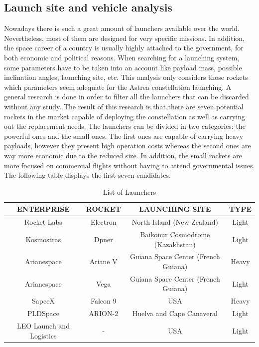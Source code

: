 	\subsection{Launch site and vehicle analysis}
Nowadays there is such a great amount of launchers available over the world. Nevertheless, most of them are designed for very specific missions. In addition, the space career of a country is usually highly attached to the government, for both economic and political reasons. When searching for a launching system, some parameters have to be taken into an account like payload mass, possible inclination angles, launching site, etc. This analysis only considers those rockets which parameters seem adequate for the Astrea constellation launching.  
\newline
\newline
A general research is done in order to filter all the launchers that can be discarded without any study. The result of this research is that there are seven potential rockets in the market capable of deploying the constellation as well as carrying out the replacement needs. The launchers can be divided in two categories: the powerful ones and the small ones. The first ones are capable of carrying heavy payloads, however they present high operation costs whereas the second ones are way more economic due to the reduced size. In addition, the small rockets are more focused on commercial flights without having to attend governmental issues. 
The following table displays the first seven candidates. 
\newline	
	\begin{table}[h]
	\begin{center}
	\begin{tabular}{|c|c|c|c|}
	\hline
	\bf{ENTERPRISE} & \bf{ROCKET} & \bf{LAUNCHING SITE} & \bf{TYPE}  \\
	\hline 
	Rocket Labs & Electron & North Island (New Zealand) & Light \\
	\hline 
	Kosmostras & Dpner & Baikonur Cosmodrome (Kazakhstan) & Light\\
	\hline 
	Arianespace & Ariane V & Guiana Space Center (French Guiana) & Heavy \\
	\hline
	 Arianespace & Vega & Guiana Space Center (French Guiana) & Light\\
	\hline 
	SapceX & Falcon 9 & USA & Heavy \\
	\hline 
	PLDSpace & ARION-2 & Huelva and Cape Canaveral & Light\\
	\hline 
	LEO Launch and Logistics & - & USA & Light \\
	\hline
	\end{tabular}
	\end{center}
	\caption{List of Launchers}
	\end{table} 	
\newline \newline \newline \newline \newline \newline \newline \newline \newline \newline
